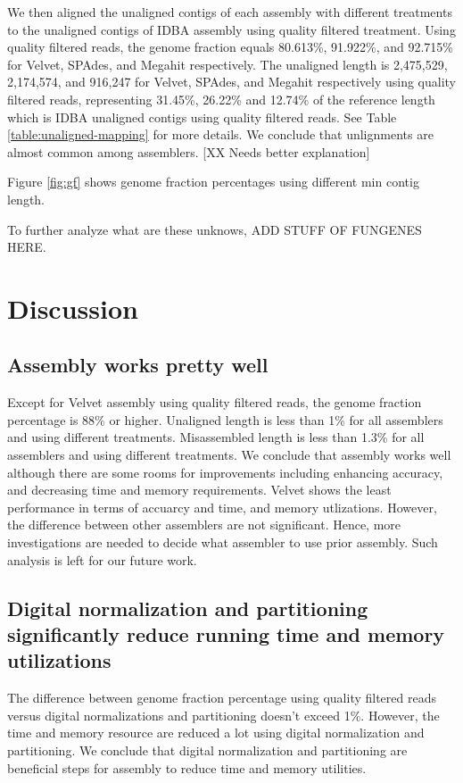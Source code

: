 We then aligned the unaligned contigs of each assembly with different treatments to the unaligned contigs of IDBA assembly using quality filtered treatment. 
Using quality filtered reads, the genome fraction equals 80.613\%, 91.922\%, and 92.715\% for Velvet, SPAdes, and Megahit respectively.  The unaligned length is 2,475,529, 2,174,574, and  916,247  for Velvet, SPAdes, and Megahit respectively using quality filtered reads, representing 31.45\%, 26.22\% and 12.74\% of the reference length which is IDBA unaligned contigs using quality filtered reads. See Table \ref{table:unaligned-mapping} for more details. We conclude that unlignments are almost common among assemblers.  [XX Needs better explanation]

Figure \ref{fig:gf} shows genome fraction percentages using different min contig length. 


To further analyze what are these unknows,  ADD STUFF OF FUNGENES HERE. 
\section*{Discussion}
 
 \subsection*{Assembly works pretty well} 
 Except for Velvet assembly using quality filtered reads, the genome fraction percentage is  88\% or higher.  Unaligned length is less than 1\% for all assemblers and using different treatments. 
 Misassembled length is less than 1.3\% for all assemblers and using different treatments. We conclude that assembly works well although there are some rooms for improvements including enhancing accuracy, and decreasing time and memory requirements. Velvet shows the least performance in terms of accuarcy and time, and memory utlizations. However, the difference between other assemblers are not significant. Hence, more investigations are needed to decide what assembler to use prior assembly. Such analysis is left for our future work. 
 
 \subsection*{Digital normalization and partitioning significantly reduce running time and memory utilizations}
 
The difference between genome fraction percentage using quality filtered reads versus digital normalizations and partitioning doesn't exceed 1\%. However, the time and memory resource are reduced a lot using digital normalization and partitioning. We conclude that digital normalization and partitioning are beneficial steps for assembly to reduce time and memory utilities. 
 
